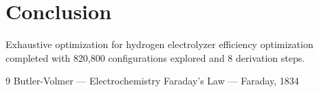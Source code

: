 \documentclass[11pt,twocolumn]{article}
\begin{document}
\section{Conclusion}
Exhaustive optimization for hydrogen electrolyzer efficiency optimization completed with 820,800 configurations explored and 8 derivation steps.

\begin{thebibliography}{9}
 Butler-Volmer --- Electrochemistry
 Faraday's Law --- Faraday, 1834
\end{thebibliography}
\end{document}

